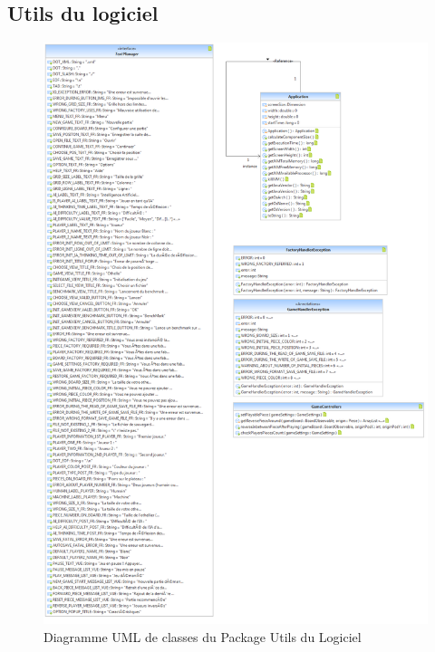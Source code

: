 \documentclass[a4paper,12pt]{report}
\begin{document}
\subsection{Utils du logiciel}
\label{OthKerUtils}
\begin{figure}[H]
\centering
 \includegraphics[scale=0.35]{Kernel/Pack_utils.png}
\caption{Diagramme UML de classes du Package Utils du Logiciel}
\end{figure}
\end{document}
